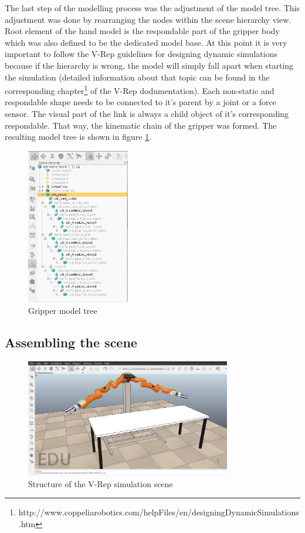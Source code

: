 The last step of the modelling process was the adjustment of the model tree. This adjustment was done by rearranging the nodes within the scene hierarchy view. Root element of the hand model is the respondable part of the gripper body which was also defined to be the dedicated model base. At this point it is very important to follow the V-Rep guidelines for designing dynamic simulations because if the hierarchy is wrong, the model will simply fall apart when starting the simulation (detailed information about that topic can be found in the corresponding chapter\footnote{http://www.coppeliarobotics.com/helpFiles/en/designingDynamicSimulations.htm} of the V-Rep dodumentation). Each non-static and respondable shape needs to be connected to it's parent by a joint or a force sensor. The visual part of the link is always a child object of it's corresponding respondable. That way, the kinematic chain of the gripper was formed. The resulting model tree is shown in figure \ref{fig:gripper_tree}.
\begin{figure}[ht]
	\centering
  	\includegraphics[width=0.4\textwidth]{images/gripper_tree.jpg}
	\caption{Gripper model tree}
	\label{fig:gripper_tree}
\end{figure}

\subsection{Assembling the scene}

\begin{figure}[hbt]
	\centering
  	\includegraphics[width=0.8\textwidth]{images/simulation_scene.jpg}
	\caption{Structure of the V-Rep simulation scene}
	\label{fig:sim_scene}
\end{figure}

